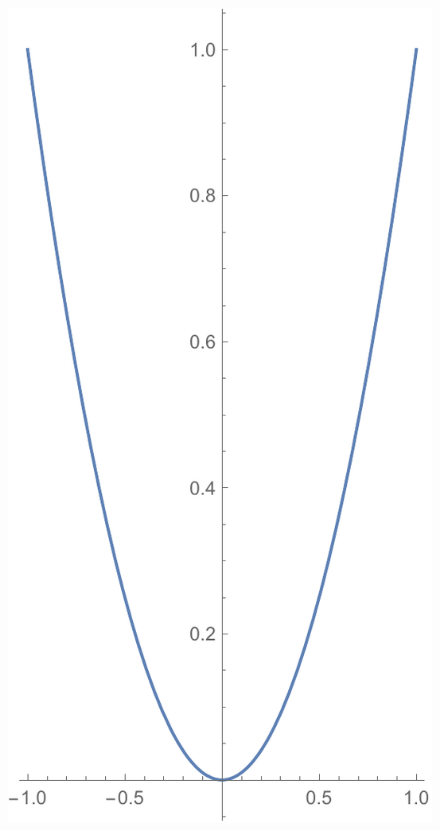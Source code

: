 \documentclass[a4paper, 12pt]{article}
\begin{document}
\begin{itemize}
		\newpage 
		\begin{figure}[!h]\label{parabola}
			\centering
			\includegraphics[scale=.55]{images/aspectdouble}
		\end{figure}
	

\end{itemize}
\end{document}

